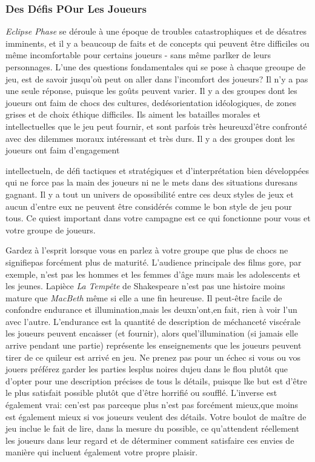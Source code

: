 {\subsubsection{Des Défis POur Les Joueurs} 

\textit{Eclipse Phase} se déroule à une époque de troubles catastrophiques et de désatres imminents, et il y a beaucoup de faits et de concepts qui peuvent être difficiles ou même incomfortable pour certains joueurs - sans même parlker de leurs personnages. L'une des questions fondamentales qui se pose à chaque greoupe de jeu, est de savoir jusqu'où peut on aller dans l'incomfort des joueurs? Il n'y a pas une seule réponse, puisque les goûts peuvent varier. Il y a des groupes dont les joueurs ont faim de chocs des cultures, dedésorientation idéologiques, de zones grises et de choix éthique difficiles. Ils aiment les batailles morales et intellectuelles que le jeu peut fournir, et sont parfois très heureuxd'être confronté avec des dilemmes moraux intéressant et très durs. Il y a des groupes dont les joueurs ont faim d'engagement 

intellectueln, de défi tactiques et stratégiques et d'interprétation bien développées qui ne force pas la main des joueurs ni ne le mets dans des situations duresans gagnant. Il y a tout un univers de opossibilité entre ces deux styles de jeux et aucun d'entre eux ne peuvent être considérés comme le bon style de jeu pour tous. Ce quiest important dans votre campagne est ce qui fonctionne pour vous et votre groupe de joueurs. 

Gardez à l'esprit lorsque vous en parlez à votre groupe que plus de chocs ne signifiepas forcément plus de maturité. L'audience principale des films gore, par exemple, n'est  pas les hommes et les femmes d'âge murs mais les adolescents et les jeunes. Lapièce \textit{La Tempête} de Shakespeare n'est pas une histoire moins mature que \textit{MacBeth} même si elle a une fin heureuse. Il peut-être facile de confondre endurance et illumination,mais les deuxn'ont,en fait, rien à voir l'un avec l'autre. L'endurance est la quantité de description de méchanceté viscérale les joueurs peuvent encaisser (et fournir), alors quel'illumination (si jamais elle arrive pendant une partie) représente les enseignements que les joueurs peuvent tirer de ce quileur est arrivé en jeu. Ne prenez pas pour un échec si vous ou vos jouers préférez garder les parties lesplus noires dujeu dans le flou plutôt que d'opter pour une description précises de tous ls détails, puisque lke but est d'être le plus satisfait possible plutôt que d'être horrifié ou soufflé. L'inverse est également vrai: cen'est pas parceque plus n'est pas forcément mieux,que moins est également mieux si vos joueurs veulent des détails. Votre boulot de maître de jeu inclue le fait de lire, dans la mesure du possible, ce qu'attendent réellement les joueurs dans leur regard et de déterminer comment satisfaire ces envies de manière qui incluent également votre propre plaisir. 

}
